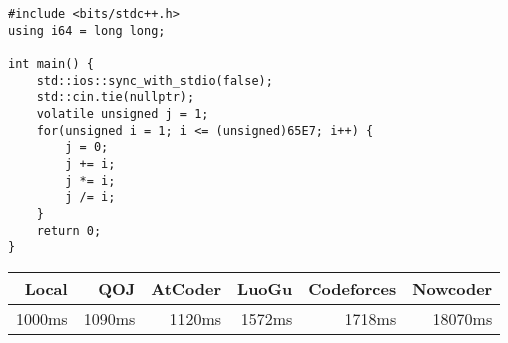 \begin{lstlisting}[style=cppstyle]
#include <bits/stdc++.h>
using i64 = long long;

int main() {
    std::ios::sync_with_stdio(false);
    std::cin.tie(nullptr);
    volatile unsigned j = 1;
    for(unsigned i = 1; i <= (unsigned)65E7; i++) {
        j = 0;
        j += i;
        j *= i;
        j /= i;
    }
    return 0;
}
\end{lstlisting}
\begin{center}
    \begin{tabular}{|r|r|r|r|r|r|}  
        \hline
        \rowcolor{gray!20}
        Local       & QOJ       & AtCoder   & LuoGu     & Codeforces    & Nowcoder  \\ \hline  
        1000ms      & 1090ms    & 1120ms    & 1572ms    & 1718ms        & 18070ms   \\ \hline 
    \end{tabular}\\
\end{center}
